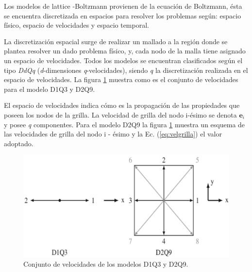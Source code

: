 Los modelos de lattice -Boltzmann provienen de la ecuación de Boltzmann, ésta se encuentra discretizada en espacios para resolver los problemas según: espacio físico, espacio de velocidades y espacio temporal. 

La discretización espacial surge de realizar un mallado a la región donde se plantea resolver un dado problema físico, y, cada nodo de la malla tiene asignado un espacio de velocidades. Todos los modelos se encuentran clasificados según el tipo \textit{DdQq} (\textit{d}-dimensiones  \textit{q}-velocidades), siendo \textit{q} la discretización realizada en el espacio de velocidades. La figura \ref{fig:D1Q3_D2Q9} muestra como es el conjunto de velocidades para el modelo D1Q3 y D2Q9.

El espacio de velocidades indica cómo es la propagación de las propiedades que poseen los nodos de la grilla. La velocidad de grilla del nodo i-ésimo se denota $\mathbf{e}_{i}$ y posee \textit{q} componentes. Para el modelo D2Q9 la figura \ref{fig:D1Q3_D2Q9} muestra un esquema de las velocidades de grilla del nodo i - ésimo y la Ec. (\ref{eq:velgrilla}) el valor adoptado.

\begin{figure}[h!]
	\centering
	\includegraphics[width=.8\textwidth]{figs/cap1/D1Q3_D2Q9}
	\caption{Conjunto de velocidades de los modelos D1Q3 y D2Q9. \cite{kruger2017lattice}}
	\label{fig:D1Q3_D2Q9}	
\end{figure}


